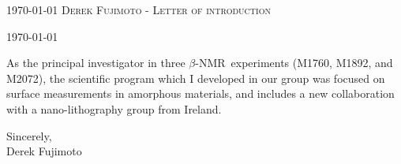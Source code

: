 \documentclass{simplehipstercv_cl}
\newcommand{\bnmr}{$\beta$-NMR}
\begin{document}
	\makecvheader

	\makecvfooter
		{\textsc{ \today}}
				{%
		}{\textsc{Derek Fujimoto - Letter of introduction}}

\vspace{0.75cm}

\color{accentcolor}
\today \par \vspace{-0.1cm}
\vspace{0.5cm}



As the principal investigator in three \bnmr\ experiments (M1760, M1892, and M2072), the scientific program which I developed in our group was focused on surface measurements in amorphous materials, and includes a new collaboration with a nano-lithography group from Ireland.




\vspace{0.5cm}
\raggedright
Sincerely,\\
\vspace{0.25cm}
Derek Fujimoto
\end{document}
